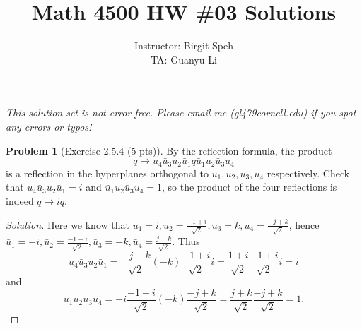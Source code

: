 \documentclass{article}
\title{Math 4500 HW \#03 Solutions}
\author{Instructor: Birgit Speh\\ TA: Guanyu Li}
\date{}
\theoremstyle{definition}
\newtheorem{problem}{Problem}
\theoremstyle{plain}
\begin{document}
\maketitle\par

\emph{This solution set is not error-free. Please email me (gl479\MVAt cornell.edu) if you spot any errors or typos!}

\begin{problem}[Exercise 2.5.4 (5 pts)]By the reflection formula, the product
\begin{displaymath}
q\mapsto u_4\bar{u}_3u_2\bar{u}_1q\bar{u}_1u_2\bar{u}_3u_4
\end{displaymath}
is a reflection in the hyperplanes orthogonal to $u_1,u_2,u_3,u_4$ respectively. Check that $u_4\bar{u}_3u_2\bar{u}_1=i$ and $\bar{u}_1u_2\bar{u}_3u_4=1$, so the product of the four reflections is indeed $q\mapsto iq$.
\end{problem}
\begin{adjustwidth}{0.7cm}{}
\color{blue}
\begin{proof}[Solution]
Here we know that $u_1=i,u_2=\frac{-1+i}{\sqrt{2}},u_3=k,u_4=\frac{-j+k}{\sqrt{2}}$, hence $\bar{u}_1=-i,\bar{u}_2=\frac{-1-i}{\sqrt{2}},\bar{u}_3=-k,\bar{u}_4=\frac{j-k}{\sqrt{2}}$. Thus
\begin{displaymath}
u_4\bar{u}_3u_2\bar{u}_1=\frac{-j+k}{\sqrt{2}}(-k)\frac{-1+i}{\sqrt{2}}i=\frac{1+i}{\sqrt{2}}\frac{-1+i}{\sqrt{2}}i=i
\end{displaymath}
and
\begin{displaymath}
\bar{u}_1u_2\bar{u}_3u_4=-i\frac{-1+i}{\sqrt{2}}(-k)\frac{-j+k}{\sqrt{2}}=\frac{j+k}{\sqrt{2}}\frac{-j+k}{\sqrt{2}}=1.
\end{displaymath}
\color{black}
\end{proof}
\end{adjustwidth}
\end{document}
